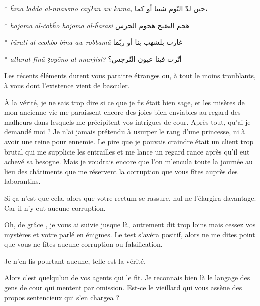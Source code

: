 \begin{drama}
\begin{paracol}{2}
      \switchcolumn[0]*
      \emph{ĥīna ladda al-nnawmo cay{\libertine{}ʔ}an aw kamā,}
      \switchcolumn[1]
      \hfill\textarabic{حين لدّ النّوم شيئا أو كما،}
      
      \switchcolumn[0]*
      \emph{hajama al-ċobĥo hojōma al-ĥarasi}
      \switchcolumn[1]
      \hfill\textarabic{هجم الصّبح هجوم الحرس}
      
      \switchcolumn[0]*
      \emph{ṙārati al-ccohbo bina aw robbamā}
      \switchcolumn[1]
      \hfill\textarabic{غارت بلشهب بنا أو ربّما}
      
      \switchcolumn[0]*
      \emph{aṫṫarat fīnā {\libertine{}ȝ}oyōno al-nnarjisi?}
      \switchcolumn[1]
      \hfill\textarabic{أتّرت فينا عيون النّرجس؟}
    \end{paracol}

   \elenaspeaks Les récents éléments durent vous paraitre étranges ou, à tout le moins troublants, à vous dont l’existence vient de basculer.

   \elaspeaks À la vérité, je ne sais trop dire si ce que je fis était bien sage, et les misères de mon ancienne vie me paraissent encore des joies bien enviables au regard des malheurs dans lesquels me précipitent vos intrigues de cour. Après tout, qu’ai-je demandé moi ? Je n’ai jamais prétendu à usurper le rang d’une princesse, ni à avoir une reine pour ennemie. Le pire que je pouvais craindre était un client trop brutal qui me supplicie les entrailles et me lance un regard rance après qu’il eut achevé sa besogne. 
   Mais je voudrais encore que l’on m’encula toute la journée au lieu des châtiments que me réservent la corruption que vous fîtes auprès des laborantins.

   \elenaspeaks Si ça n’est que cela, alors que votre rectum se rassure, nul ne l’élargira davantage. Car il n’y eut aucune corruption.

   \elaspeaks Oh, de grâce \elena, je vous ai suivie jusque là, autrement dit trop loins mais cessez vos mystères et votre parlé en énigmes. Le test s’avéra positif, alors ne me dites point que vous ne fîtes aucune corruption ou falsification.

   \elenaspeaks Je n’en fis pourtant aucune, telle est la vérité.

   \elaspeaks Alors c’est quelqu’un de vos agents qui le fit. Je reconnais bien là le langage des gens de cour qui mentent par omission. Est-ce le vieillard qui vous assène des propos sentencieux qui s’en chargea ?


\end{drama}
